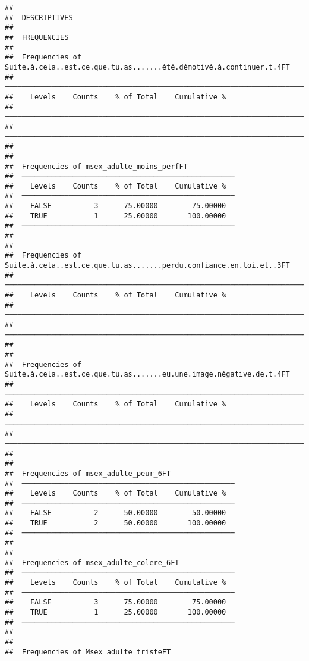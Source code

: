 \documentclass[
]{article}
\begin{document}
\begin{verbatim}
## 
##  DESCRIPTIVES
## 
##  FREQUENCIES
## 
##  Frequencies of Suite.à.cela..est.ce.que.tu.as.......été.démotivé.à.continuer.t.4FT 
##  ────────────────────────────────────────────────────────────────────────────────── 
##    Levels    Counts    % of Total    Cumulative %   
##  ────────────────────────────────────────────────────────────────────────────────── 
##  ────────────────────────────────────────────────────────────────────────────────── 
## 
## 
##  Frequencies of msex_adulte_moins_perfFT            
##  ────────────────────────────────────────────────── 
##    Levels    Counts    % of Total    Cumulative %   
##  ────────────────────────────────────────────────── 
##    FALSE          3      75.00000        75.00000   
##    TRUE           1      25.00000       100.00000   
##  ────────────────────────────────────────────────── 
## 
## 
##  Frequencies of Suite.à.cela..est.ce.que.tu.as.......perdu.confiance.en.toi.et..3FT 
##  ────────────────────────────────────────────────────────────────────────────────── 
##    Levels    Counts    % of Total    Cumulative %   
##  ────────────────────────────────────────────────────────────────────────────────── 
##  ────────────────────────────────────────────────────────────────────────────────── 
## 
## 
##  Frequencies of Suite.à.cela..est.ce.que.tu.as.......eu.une.image.négative.de.t.4FT 
##  ────────────────────────────────────────────────────────────────────────────────── 
##    Levels    Counts    % of Total    Cumulative %   
##  ────────────────────────────────────────────────────────────────────────────────── 
##  ────────────────────────────────────────────────────────────────────────────────── 
## 
## 
##  Frequencies of msex_adulte_peur_6FT                
##  ────────────────────────────────────────────────── 
##    Levels    Counts    % of Total    Cumulative %   
##  ────────────────────────────────────────────────── 
##    FALSE          2      50.00000        50.00000   
##    TRUE           2      50.00000       100.00000   
##  ────────────────────────────────────────────────── 
## 
## 
##  Frequencies of msex_adulte_colere_6FT              
##  ────────────────────────────────────────────────── 
##    Levels    Counts    % of Total    Cumulative %   
##  ────────────────────────────────────────────────── 
##    FALSE          3      75.00000        75.00000   
##    TRUE           1      25.00000       100.00000   
##  ────────────────────────────────────────────────── 
## 
## 
##  Frequencies of Msex_adulte_tristeFT                

\end{verbatim}
\end{document}
